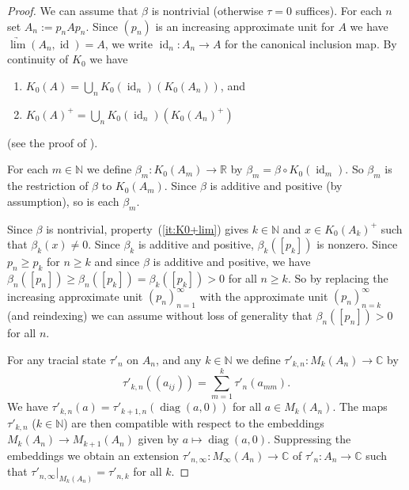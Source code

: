 \documentclass[a4paper, 12pt]{amsart}
\numberwithin{equation}{section}
\theoremstyle{remark}
\theoremstyle{definition}
\begin{document}
\begin{proof}
We can assume that $\beta$ is nontrivial (otherwise $\tau=0$ suffices). For each $n$ set
$A_n:=p_nAp_n$. Since $(p_n)$ is an increasing approximate unit for $A$ we have
$\underrightarrow{\lim} (A_n, {\operatorname{id}}) = A$, we write ${\operatorname{id}}_n\colon A_n\to A$ for the
canonical inclusion map. By continuity of $K_0$ we have
\begin{enumerate}
    \item\label{it:K0lim} $K_0(A)=\bigcup_n K_0({\operatorname{id}}_n)(K_0(A_n))$, and
    \item\label{it:K0+lim} $K_0(A)^+=\bigcup_n K_0({\operatorname{id}}_n)(K_0(A_n)^+)$
\end{enumerate}
(see the proof of \cite[Theorem~6.3.2]{MR1783408}).

For each $m\in {\mathbb{N}}$ we define $\beta_m\colon K_0(A_m)\to {\mathbb{R}}$ by $\beta_m = \beta \circ
K_0({\operatorname{id}}_m)$. So $\beta_m$ is the restriction of $\beta$ to $K_0(A_m)$. Since $\beta$ is
additive and positive (by assumption), so is each $\beta_m$.

Since $\beta$ is nontrivial, property~(\ref{it:K0+lim}) gives $k \in {\mathbb{N}}$ and $x\in
K_0(A_k)^+$ such that $\beta_k(x)\neq 0$. Since $\beta_k$ is additive and positive,
$\beta_k([p_k])$ is nonzero. Since $p_n \geq p_k$ for $n \ge k$ and since $\beta$ is
additive and positive, we have $\beta_n([p_n]) \ge \beta_n([p_k]) = \beta_k([p_k]) > 0$
for all $n \ge k$. So by replacing the increasing approximate unit $(p_n)^\infty_{n=1}$
with the approximate unit $(p_n)_{n=k}^\infty$ (and reindexing) we can assume without
loss of generality that $\beta_n([p_n]) > 0$ for all $n$.

For any tracial state $\tau'_n$ on $A_n$, and any $k \in {\mathbb{N}}$ we define $\tau'_{k,n} \colon M_k(A_n)\to {\mathbb{C}}$ by $$\tau'_{k,n}((a_{i j}))=\sum_{m=1}^k\tau'_n(a_{m m}).$$ We have $\tau'_{k,n}(a) = \tau'_{k+1,n}({\operatorname{diag}}(a,0))$ for all $a\in M_k(A_n)$. The maps $\tau'_{k,n}$ ($k\in{\mathbb{N}}$) are then compatible with respect to the embeddings $M_k(A_n) \to M_{k+1}(A_n)$ given by $a\mapsto {\operatorname{diag}}(a,0)$. Suppressing the embeddings we obtain an extension $\tau'_{n,\infty}\colon M_\infty(A_n)\to {\mathbb{C}}$ of $\tau'_n\colon A_n\to {\mathbb{C}}$ such that $\tau'_{n,\infty}|_{M_k(A_n)} = \tau'_{n,k}$ for all $k$.


\end{proof}
\end{document}
